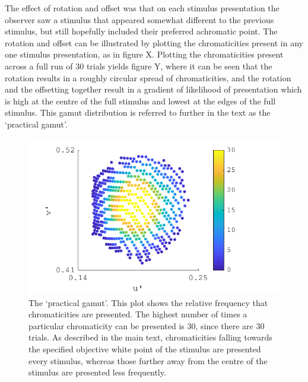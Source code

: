 The effect of rotation and offset was that on each stimulus presentation the observer saw a stimulus that appeared somewhat different to the previous stimulus, but still hopefully included their preferred achromatic point. The rotation and offset can be illustrated by plotting the chromaticities present in any one stimulus presentation, as in figure X. Plotting the chromaticities present across a full run of 30 trials yields figure Y, where it can be seen that the rotation results in a roughly circular spread of chromaticities, and the rotation and the offsetting together result in a gradient of likelihood of presentation which is high at the centre of the full stimulus and lowest at the edges of the full stimulus. This gamut distribution is referred to further in the text as the `practical gamut'.



\begin{figure}[hbp]
\includegraphics[width=\textwidth]{figs/tablet/practical_gamut.pdf}
\caption{The `practical gamut'. This plot shows the relative frequency that chromaticities are presented. The highest number of times a particular chromaticity can be presented is 30, since there are 30 trials. As described in the main text, chromaticities falling towards the specified objective white point of the stimulus are presented every stimulus, whereas those further away from the centre of the stimulus are presented less frequently.}
\label{fig:practical}
\end{figure}

